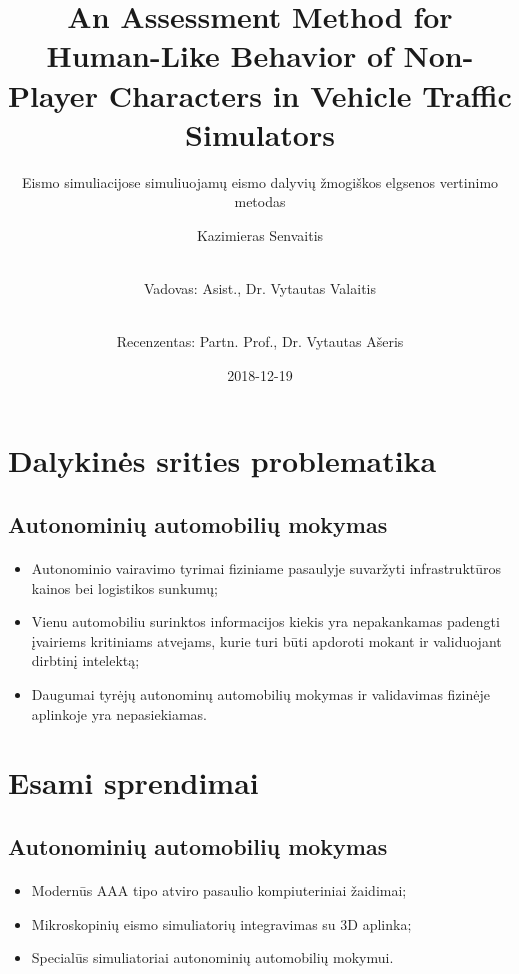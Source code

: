\documentclass{beamer}
\title{An Assessment Method for Human-Like Behavior of Non-Player Characters in Vehicle Traffic Simulators}
\subtitle{Eismo simuliacijose simuliuojamų eismo dalyvių žmogiškos elgsenos vertinimo metodas}
\author[shortname]{Kazimieras Senvaitis \and \\ Vadovas: Asist., Dr. Vytautas Valaitis  \and \\ Recenzentas: Partn. Prof., Dr. Vytautas Ašeris}
\date{2018-12-19}
\begin{document}
	
\maketitle


\section{Dalykinės srities problematika}

\subsection{\normalsize{Autonominių automobilių mokymas}}
\begin{frame}{\insertsection}
\framesubtitle{\insertsubsection}
\begin{itemize}
	\item Autonominio vairavimo tyrimai fiziniame pasaulyje suvaržyti infrastruktūros kainos bei logistikos sunkumų;
	\item Vienu automobiliu surinktos informacijos kiekis yra nepakankamas padengti įvairiems kritiniams atvejams, kurie turi būti apdoroti mokant ir validuojant dirbtinį intelektą;
	\item Daugumai tyrėjų autonominų automobilių mokymas ir validavimas fizinėje aplinkoje yra nepasiekiamas.
\end{itemize}
\end{frame}



\section{Esami sprendimai}

\subsection{\normalsize{Autonominių automobilių mokymas}}
\begin{frame}{\insertsection}
\framesubtitle{\insertsubsection}
\begin{itemize}
	\item Modernūs AAA tipo atviro pasaulio kompiuteriniai žaidimai;
	\item Mikroskopinių eismo simuliatorių integravimas su 3D aplinka;
	\item Specialūs simuliatoriai autonominių automobilių mokymui.
\end{itemize}
\end{frame}
\end{document}

